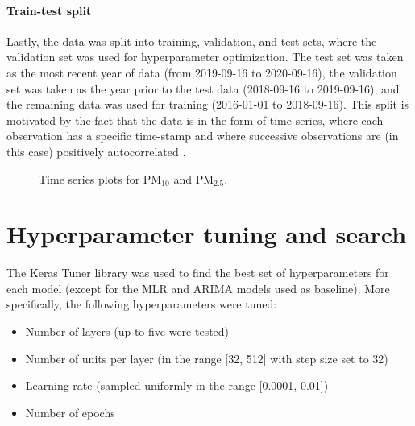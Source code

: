 \paragraph{Train-test split} Lastly, the data was split into training, validation, and test sets, where the validation set was used for hyperparameter optimization. The test set was taken as the most recent year of data (from 2019-09-16 to 2020-09-16), the validation set was taken as the year prior to the test data (2018-09-16 to 2019-09-16), and the remaining data was used for training (2016-01-01 to 2018-09-16). This split is motivated by the fact that the data is in the form of time-series, where each observation has a specific time-stamp and where successive observations are (in this case) positively autocorrelated \cite{Brockwell2016}.



\begin{figure}[h]
\centering
{}
\caption{Time series plots for PM$_{10}$ and PM$_{2.5}$.}
\label{fig:time_series_plots}
\end{figure}

\section{Hyperparameter tuning and search}
\label{sec:tuning}

The Keras Tuner library \cite{omalley2019kerastuner} was used to find the best set of hyperparameters for each model (except for the MLR and ARIMA models used as baseline). 
More specifically, the following hyperparameters were tuned:

\begin{itemize}
\item Number of layers (up to five were tested)
\item Number of units per layer (in the range [32, 512] with step size set to 32)
\item Learning rate (sampled uniformly in the range [0.0001, 0.01])
\item Number of epochs 
\end{itemize} 

